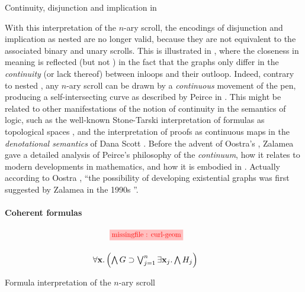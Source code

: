 \begin{scope}
\begin{marginfigure}
  
  \caption{Continuity, disjunction and implication in }
\end{marginfigure}

With this interpretation of the $n$-ary scroll, the  encodings of
disjunction and implication as nested  are no longer valid, because they are
not  equivalent to the associated binary and unary scrolls.
This is illustrated in , where the closeness in meaning is
reflected  (but not ) in the fact that the graphs only
differ in the \emph{continuity} (or lack thereof) between inloops and their
outloop. Indeed, contrary to nested , any $n$-ary scroll can be drawn by a
\emph{continuous} movement of the pen, producing a self-intersecting curve as
described by Peirce in \cite{peirce_prolegomena_1906}. This might be related to
other manifestations of the notion of continuity in the semantics of
 logic, such as the well-known Stone-Tarski interpretation of
formulas as topological spaces \cite{stone_topological_1938}, and the
interpretation of proofs as continuous maps in the \emph{denotational semantics}
of Dana Scott . Before the advent of Oostra's
, Zalamea gave a detailed analysis of Peirce's philosophy of
the \emph{continuum}, how it relates to modern developments in mathematics, and
how it is embodied in  \cite{zalamea_peirces_2003}. Actually
according to Oostra , ``the
possibility of developing  existential graphs was first suggested
by Zalamea in the 1990s \cite{zalamea_ieg_1,zalamea_ieg_2}''.

\paragraph{Coherent formulas}

\begin{marginfigure}
  $$
  \!\!\!\!
  \!\!\!\!
  \!\!\!\!
  \begin{array}{c}
    \tikzfig{0.85}{0.85}{curl-geom} \vspace{1.5em}\\
    \forall \bx. \left(\bigwedge G \limp \bigvee_{j = 1}^{n}\exists \bx_j. \bigwedge H_j\right)
  \end{array}
  $$
  \caption{Formula interpretation of the $n$-ary scroll}
\end{marginfigure}


\end{scope}
